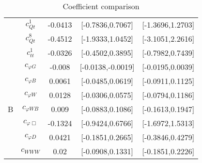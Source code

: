 \documentclass{article}
\begin{document}
\begin{table}[H]
\begin{tabular}{|c|c|c|c|c|}
 & $c_{Qt}^{1}$ & -0.0413                             & [-0.7836,0.7067]                                 & [-1.3696,1.2703] \\ \cline{2-5}
 & $c_{Qt}^{8}$ & -0.4512                             & [-1.9333,1.0452]                                 & [-3.1051,2.2616] \\ \cline{2-5}
 & $c_{tt}^{1}$ & -0.0326                             & [-0.4502,0.3895]                                 & [-0.7982,0.7439] \\ \cline{2-5}
\hline
\multirow{7}{*}{B}
 & $c_{\varphi G}$ & -0.008                             & [-0.0138,-0.0019]                                 & [-0.0195,0.0039] \\ \cline{2-5}
 & $c_{\varphi B}$ & 0.0061                             & [-0.0485,0.0619]                                 & [-0.0911,0.1125] \\ \cline{2-5}
 & $c_{\varphi W}$ & 0.0128                             & [-0.0306,0.0575]                                 & [-0.0794,0.1186] \\ \cline{2-5}
 & $c_{\varphi WB}$ & 0.009                             & [-0.0883,0.1086]                                 & [-0.1613,0.1947] \\ \cline{2-5}
 & $c_{\varphi \Box}$ & -0.1324                             & [-0.9424,0.6766]                                 & [-1.6972,1.5313] \\ \cline{2-5}
 & $c_{\varphi D}$ & 0.0421                             & [-0.1851,0.2665]                                 & [-0.3846,0.4279] \\ \cline{2-5}
 & $c_{WWW}$ & 0.02                             & [-0.0908,0.1331]                                 & [-0.1851,0.2226] \\ \cline{2-5}
\hline
\end{tabular}
\caption{Coefficient comparison}
\end{table}
\end{document}
